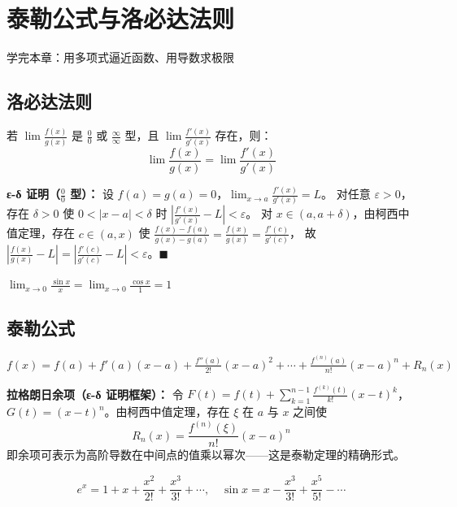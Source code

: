 \chapter{泰勒公式与洛必达法则}
\begin{applicationbox}
学完本章：用多项式逼近函数、用导数求极限
\end{applicationbox}

\section{洛必达法则}
若 \(\lim\frac{f(x)}{g(x)}\) 是 \(\frac00\) 或 \(\frac\infty\infty\) 型，且 \(\lim\frac{f'(x)}{g'(x)}\) 存在，则：
\[\lim\frac{f(x)}{g(x)} = \lim\frac{f'(x)}{g'(x)}\]

\textbf{ε-δ 证明（\(\frac00\) 型）：} 设 \(f(a)=g(a)=0\)，\(\lim_{x\to a}\frac{f'(x)}{g'(x)}=L\)。
对任意 \(\varepsilon>0\)，存在 \(\delta>0\) 使 \(0<|x-a|<\delta\) 时 \(|\frac{f'(x)}{g'(x)}-L|<\varepsilon\)。
对 \(x\in(a,a+\delta)\)，由柯西中值定理，存在 \(c\in(a,x)\) 使
\(\frac{f(x)-f(a)}{g(x)-g(a)}=\frac{f(x)}{g(x)}=\frac{f'(c)}{g'(c)}\)，
故 \(|\frac{f(x)}{g(x)}-L|=|\frac{f'(c)}{g'(c)}-L|<\varepsilon\)。\(\blacksquare\)

\begin{examplebox}[1]
\(\lim_{x\to0}\frac{\sin x}{x} = \lim_{x\to0}\frac{\cos x}{1} = 1\)
\end{examplebox}

\section{泰勒公式}
\(f(x) = f(a) + f'(a)(x-a) + \frac{f''(a)}{2!}(x-a)^2 + \cdots + \frac{f^{(n)}(a)}{n!}(x-a)^n + R_n(x)\)

\textbf{拉格朗日余项（ε-δ 证明框架）：} 令 \(F(t)=f(t)+\sum_{k=1}^{n-1}\frac{f^{(k)}(t)}{k!}(x-t)^k\)，
\(G(t)=(x-t)^n\)。由柯西中值定理，存在 \(\xi\) 在 \(a\) 与 \(x\) 之间使
\[R_n(x)=\frac{f^{(n)}(\xi)}{n!}(x-a)^n\]
即余项可表示为高阶导数在中间点的值乘以幂次——这是泰勒定理的精确形式。

\begin{examplebox}[2——常用展开]
\[e^x=1+x+\frac{x^2}{2!}+\frac{x^3}{3!}+\cdots,\quad \sin x = x-\frac{x^3}{3!}+\frac{x^5}{5!}-\cdots\]
\end{examplebox}

